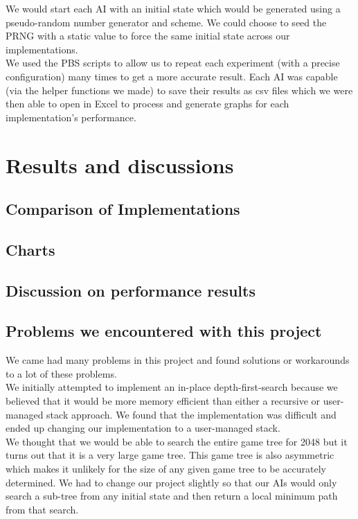 \documentclass[11pt]{article}
\begin{document}
\begin{page}
We would start each AI with an initial state which would be generated using a pseudo-random number generator and scheme. We could choose to seed the PRNG with a static value to force the same initial state across our implementations.\\

We used the PBS scripts to allow us to repeat each experiment (with a precise configuration) many times to get a more accurate result. Each AI was capable (via the helper functions we made) to save their results as csv files which we were then able to open in Excel to process and generate graphs for each implementation’s performance. 


\section{Results and discussions}

\subsection{Comparison of Implementations}

\subsection{Charts}

\subsection{Discussion on performance results}

\subsection{Problems we encountered with this project}
We came had many problems in this project and found solutions or workarounds to a lot of these problems.\\

We initially attempted to implement an in-place depth-first-search because we believed that it would be more memory efficient than either a recursive or user-managed stack approach. We found that the implementation was difficult and ended up changing our implementation to a user-managed stack.\\

We thought that we would be able to search the entire game tree for 2048 but it turns out that it is a very large game tree. This game tree is also asymmetric which makes it unlikely for the size of any given game tree to be accurately determined. We had to change our project slightly so that our AIs would only search a sub-tree from any initial state and then return a local minimum path from that search.\\


\end{page}
\end{document}
